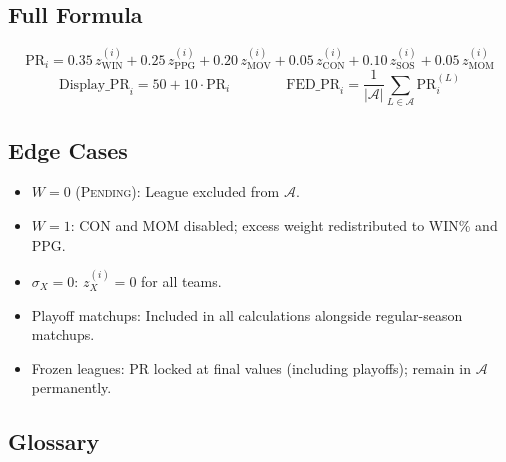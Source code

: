 \documentclass[11pt,a4paper]{article}
\begin{document}
\subsection{Full Formula}

\[
\text{PR}_i = 0.35\, z^{(i)}_{\text{WIN}} + 0.25\, z^{(i)}_{\text{PPG}} + 0.20\, z^{(i)}_{\text{MOV}} + 0.05\, z^{(i)}_{\text{CON}} + 0.10\, z^{(i)}_{\text{SOS}} + 0.05\, z^{(i)}_{\text{MOM}}
\]
\[
\text{Display\_PR}_i = 50 + 10 \cdot \text{PR}_i \qquad\qquad \text{FED\_PR}_i = \frac{1}{|\mathcal{A}|} \sum_{L \in \mathcal{A}} \text{PR}^{(L)}_i
\]

\subsection{Edge Cases}

\begin{itemize}[nosep]
\item $W = 0$ (\textsc{Pending}): League excluded from $\mathcal{A}$.
\item $W = 1$: CON and MOM disabled; excess weight redistributed to WIN\% and PPG.
\item $\sigma_X = 0$: $z^{(i)}_X = 0$ for all teams.
\item Playoff matchups: Included in all calculations alongside regular-season matchups.
\item Frozen leagues: PR locked at final values (including playoffs); remain in $\mathcal{A}$ permanently.
\end{itemize}

\subsection{Glossary}
\end{document}
